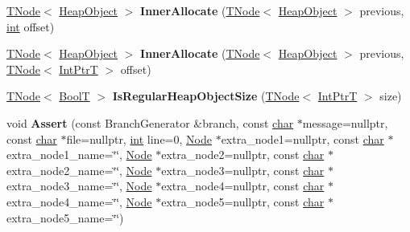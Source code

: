 \begin{DoxyCompactItemize}
\item 
\mbox{\label{classv8_1_1internal_1_1CodeStubAssembler_a5694a1d995f2b60e0ac897479c64780d}} 
\mbox{\hyperlink{classv8_1_1internal_1_1compiler_1_1TNode}{T\+Node}}$<$ \mbox{\hyperlink{classv8_1_1internal_1_1HeapObject}{Heap\+Object}} $>$ {\bfseries Inner\+Allocate} (\mbox{\hyperlink{classv8_1_1internal_1_1compiler_1_1TNode}{T\+Node}}$<$ \mbox{\hyperlink{classv8_1_1internal_1_1HeapObject}{Heap\+Object}} $>$ previous, \mbox{\hyperlink{classint}{int}} offset)
\item 
\mbox{\label{classv8_1_1internal_1_1CodeStubAssembler_a7c919d5de3c5b8031527e73646a1c67c}} 
\mbox{\hyperlink{classv8_1_1internal_1_1compiler_1_1TNode}{T\+Node}}$<$ \mbox{\hyperlink{classv8_1_1internal_1_1HeapObject}{Heap\+Object}} $>$ {\bfseries Inner\+Allocate} (\mbox{\hyperlink{classv8_1_1internal_1_1compiler_1_1TNode}{T\+Node}}$<$ \mbox{\hyperlink{classv8_1_1internal_1_1HeapObject}{Heap\+Object}} $>$ previous, \mbox{\hyperlink{classv8_1_1internal_1_1compiler_1_1TNode}{T\+Node}}$<$ \mbox{\hyperlink{structv8_1_1internal_1_1IntPtrT}{Int\+PtrT}} $>$ offset)
\item 
\mbox{\label{classv8_1_1internal_1_1CodeStubAssembler_a38c3c154ccd5ea8a05e434868dc58629}} 
\mbox{\hyperlink{classv8_1_1internal_1_1compiler_1_1TNode}{T\+Node}}$<$ \mbox{\hyperlink{structv8_1_1internal_1_1BoolT}{BoolT}} $>$ {\bfseries Is\+Regular\+Heap\+Object\+Size} (\mbox{\hyperlink{classv8_1_1internal_1_1compiler_1_1TNode}{T\+Node}}$<$ \mbox{\hyperlink{structv8_1_1internal_1_1IntPtrT}{Int\+PtrT}} $>$ size)
\item 
\mbox{\label{classv8_1_1internal_1_1CodeStubAssembler_acc96e711cb4e0f8a341730d53ccc6e05}} 
void {\bfseries Assert} (const Branch\+Generator \&branch, const \mbox{\hyperlink{classchar}{char}} $\ast$message=nullptr, const \mbox{\hyperlink{classchar}{char}} $\ast$file=nullptr, \mbox{\hyperlink{classint}{int}} line=0, \mbox{\hyperlink{classv8_1_1internal_1_1compiler_1_1Node}{Node}} $\ast$extra\+\_\+node1=nullptr, const \mbox{\hyperlink{classchar}{char}} $\ast$extra\+\_\+node1\+\_\+name=\char`\"{}\char`\"{}, \mbox{\hyperlink{classv8_1_1internal_1_1compiler_1_1Node}{Node}} $\ast$extra\+\_\+node2=nullptr, const \mbox{\hyperlink{classchar}{char}} $\ast$extra\+\_\+node2\+\_\+name=\char`\"{}\char`\"{}, \mbox{\hyperlink{classv8_1_1internal_1_1compiler_1_1Node}{Node}} $\ast$extra\+\_\+node3=nullptr, const \mbox{\hyperlink{classchar}{char}} $\ast$extra\+\_\+node3\+\_\+name=\char`\"{}\char`\"{}, \mbox{\hyperlink{classv8_1_1internal_1_1compiler_1_1Node}{Node}} $\ast$extra\+\_\+node4=nullptr, const \mbox{\hyperlink{classchar}{char}} $\ast$extra\+\_\+node4\+\_\+name=\char`\"{}\char`\"{}, \mbox{\hyperlink{classv8_1_1internal_1_1compiler_1_1Node}{Node}} $\ast$extra\+\_\+node5=nullptr, const \mbox{\hyperlink{classchar}{char}} $\ast$extra\+\_\+node5\+\_\+name=\char`\"{}\char`\"{})

\end{DoxyCompactItemize}
